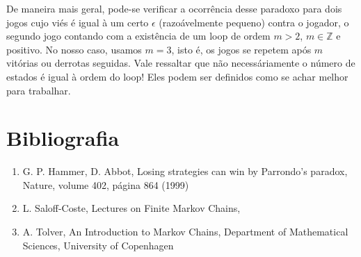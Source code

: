 \documentclass[12pt]{article}
\begin{document}
De maneira mais geral, pode-se verificar a ocorrência desse paradoxo para dois jogos cujo viés é igual à um certo $\epsilon$ (razoávelmente pequeno) contra o jogador, o segundo jogo contando com a existência de um loop de ordem $m > 2$, $m \in \mathbb{Z}$ e positivo. No nosso caso, usamos $m = 3$, isto é, os jogos se repetem após $m$ vitórias ou derrotas seguidas. Vale ressaltar que não necessáriamente o número de estados é igual à ordem do loop! Eles podem ser definidos como se achar melhor para trabalhar.

\section*{Bibliografia}
\begin{enumerate}
	\item G. P. Hammer, D. Abbot, Losing strategies can win
by Parrondo’s paradox, Nature, volume 402, página 864 (1999)

	\item L. Saloff-Coste, Lectures on Finite Markov Chains, 
	
	\item A. Tolver, An Introduction to Markov Chains, Department of Mathematical Sciences, University of Copenhagen
\end{enumerate}
\end{document}
